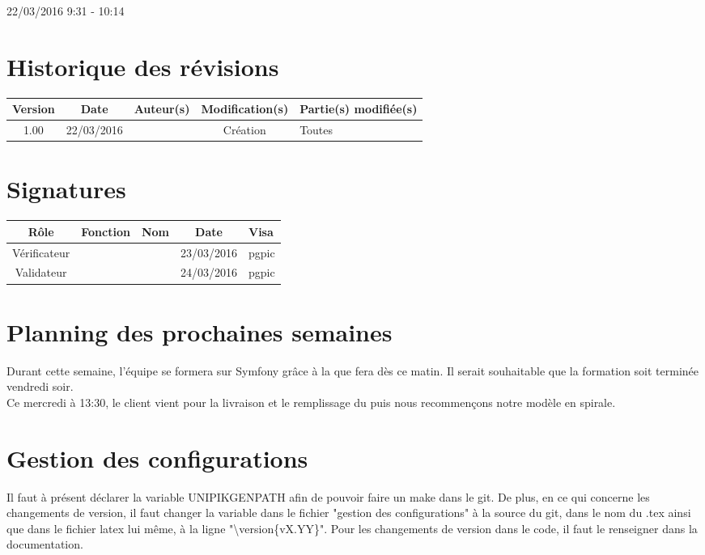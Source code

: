\documentclass [a4paper] {article}
\begin{document}
22/03/2016			 				%
\hfill   
\hfill 	 9:31 - 10:14 				%



\section*{Historique des révisions}
\begin{center}
			\begin{tabular}{| c | c | c | c | p{4cm} |}
				\hline
				\rowcolor{Gray}
				Version & Date & Auteur(s) & Modification(s) & Partie(s) modifiée(s)		 \\
				\hline
				1.00 & 22/03/2016 & \Pierre & Création & Toutes \\
		\hline		
			\end{tabular}
		\end{center}

\section*{Signatures}

		\begin{center}
			\begin{tabular}{| c | c | c | c | p{4cm} |}
				\hline
				\rowcolor{Gray}
				Rôle & Fonction & Nom & Date & Visa		 \\
				\hline
				Vérificateur & \RQA & \Kafui & 23/03/2016 & pgpic \\[30pt]
				\hline
				Validateur & \CP & \Sergi & 24/03/2016 & pgpic \\[30pt]	
				\hline
			\end{tabular}
		\end{center}
		
\newpage		



\section{Planning des prochaines semaines}
Durant cette semaine, l'équipe se formera sur Symfony grâce à la \FF{} que \Florian{} fera dès ce matin. Il serait souhaitable que la formation soit terminée vendredi soir. \\
Ce mercredi à 13:30, le client vient pour la livraison et le remplissage du \CDR{} puis nous recommençons notre modèle en spirale.


\section{Gestion des configurations}
Il faut à présent déclarer la variable UNIPIKGENPATH afin de pouvoir faire un make dans le git. De plus, en ce qui concerne les changements de version, il faut changer la variable dans le fichier "gestion des configurations" à la source du git, dans le nom du .tex ainsi que dans le fichier latex lui même, à la ligne "\textbackslash version\{vX.YY\}".
Pour les changements de version dans le code, il faut le renseigner dans la documentation.
\end{document}

